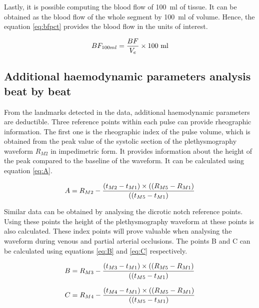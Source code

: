 Lastly, it is possible computing the blood flow of \SI{100}{\milli\litre} of tissue.  It can be obtained as the blood flow of the whole segment by \SI{100}{\milli\litre} of volume. Hence, the equation \ref{eq:bfpct} provides the blood flow in the units of interest. 

\begin{align}
	\label{eq:bfpct}
	BF_{100ml} = \frac{BF}{V_e} \times \text{100 ml} \tagaddtext{[\si{\bfv}]}
\end{align}

\subsection{Additional haemodynamic parameters analysis beat by beat}
\label{section4.3.3}
From the landmarks detected in the data, additional haemodynamic parameters are deductible. Three reference points within each pulse can provide rheographic information. The first one is the rheographic index of the pulse volume, which is obtained from the peak value of the systolic section of the plethysmography waveform $R_{M2}$ in impedimetric form. It provides information about the height of the peak compared to the baseline of the waveform. It can be calculated using equation \ref{eq:A}.

\begin{align}
	\label{eq:A}
	A = R_{M2} - \frac{(t_{M2}-t_{M1}) \times ((R_{M5}-R_{M1})}{((t_{M5}-t_{M1})} \tagaddtext{[\si{\ohm}]}
\end{align}

Similar data can be obtained by analysing the dicrotic notch reference points. Using these points the height of the plethysmography waveform at these points is also calculated. These index points will prove valuable when analysing the waveform during venous and partial arterial occlusions. The points B and C can be calculated using equations \ref{eq:B} and \ref{eq:C} respectively.  

\begin{align}
	\label{eq:B}
	B = R_{M3} - \frac{(t_{M3}-t_{M1}) \times ((R_{M5}-R_{M1})}{((t_{M5}-t_{M1})} \tagaddtext{[\si{\ohm}]}
\end{align}

\begin{align}
	\label{eq:C}
	C = R_{M4} - \frac{(t_{M4}-t_{M1}) \times ((R_{M5}-R_{M1})}{((t_{M5}-t_{M1})} \tagaddtext{[\si{\ohm}]}
\end{align}

